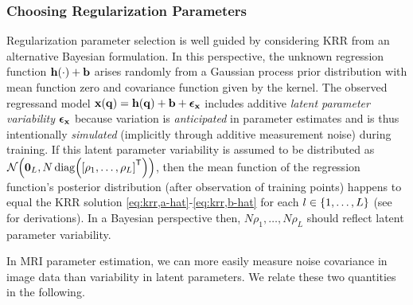 \subsubsection{Choosing Regularization Parameters}
\label{sss,krr,pract,mod,rho}

Regularization parameter selection is well guided
by considering KRR from an alternative Bayesian formulation.
In this perspective,
the unknown regression function
$\bmh\paren{\cdot}+\bmb$ arises randomly 
from a Gaussian process prior distribution
with mean function zero
and covariance function
given by the kernel.
The observed regressand model
$\bmx\paren{\bmq} = \bmh\paren{\bmq}+\bmb + \bmeps_\bmx$
includes additive \emph{latent parameter variability} $\boldsymbol{\epsilon}_{\mathbf{x}}$
because variation is \emph{anticipated} in parameter estimates
and is thus intentionally \emph{simulated} 
(implicitly through additive measurement noise)
during training.
If this latent parameter variability is assumed 
to be distributed as 
$\gauss{\zeros{L}}{N\diag{\brac{\rho_1,\dots,\rho_L}\tpose}}$,
then the mean function
of the regression function's posterior distribution
(after observation of training points)
happens to equal the KRR solution 
\eqref{eq:krr,a-hat}-\eqref{eq:krr,b-hat}
for each $l \in \set{1,\dots,L}$
(see \cite[Ch.~2]{rasmussen:05:gpf} for derivations).
In a Bayesian perspective then,
$N\rho_1,\dots,N\rho_L$ should reflect
latent parameter variability.

In MRI parameter estimation,
we can more easily measure noise covariance
in image data
than variability in latent parameters. 
We relate these two quantities
in the following.

